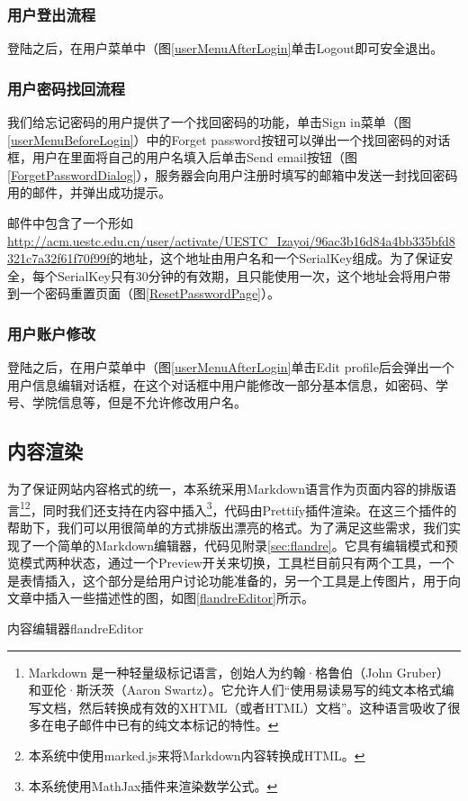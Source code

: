 \subsubsection{用户登出流程}
登陆之后，在用户菜单中（图\ref{userMenuAfterLogin}单击Logout即可安全退出。

\subsubsection{用户密码找回流程}
我们给忘记密码的用户提供了一个找回密码的功能，单击Sign in菜单（图\ref{userMenuBeforeLogin}）中的Forget password按钮可以弹出一个找回密码的对话框，用户在里面将自己的用户名填入后单击Send email按钮（图\ref{ForgetPasswordDialog}），服务器会向用户注册时填写的邮箱中发送一封找回密码用的邮件，并弹出成功提示。

邮件中包含了一个形如\url{http://acm.uestc.edu.cn/user/activate/UESTC_Izayoi/96ac3b16d84a4bb335bfd8321c7a32f61f70f99f}的地址，这个地址由用户名和一个SerialKey组成。为了保证安全，每个SerialKey只有30分钟的有效期，且只能使用一次，这个地址会将用户带到一个密码重置页面（图\ref{ResetPasswordPage}）。


\subsubsection{用户账户修改}
登陆之后，在用户菜单中（图\ref{userMenuAfterLogin}单击Edit profile后会弹出一个用户信息编辑对话框，在这个对话框中用户能修改一部分基本信息，如密码、学号、学院信息等，但是不允许修改用户名。

\subsection{内容渲染}
为了保证网站内容格式的统一，本系统采用Markdown语言作为页面内容的排版语言\footnote{Markdown 是一种轻量级标记语言，创始人为约翰·格鲁伯（John Gruber）和亚伦·斯沃茨（Aaron Swartz）。它允许人们``使用易读易写的纯文本格式编写文档，然后转换成有效的XHTML（或者HTML）文档''。这种语言吸收了很多在电子邮件中已有的纯文本标记的特性。}\footnote{本系统中使用marked.js来将Markdown内容转换成HTML。}，同时我们还支持在内容中插入\footnote{本系统使用MathJax插件来渲染数学公式。}，代码由Prettify插件渲染。在这三个插件的帮助下，我们可以用很简单的方式排版出漂亮的格式。为了满足这些需求，我们实现了一个简单的Markdown编辑器，代码见附录\ref{sec:flandre}。它具有编辑模式和预览模式两种状态，通过一个Preview开关来切换，工具栏目前只有两个工具，一个是表情插入，这个部分是给用户讨论功能准备的，另一个工具是上传图片，用于向文章中插入一些描述性的图，如图\ref{flandreEditor}所示。
\begin{pics}[htbp]{内容编辑器}{flandreEditor}
\end{pics}

